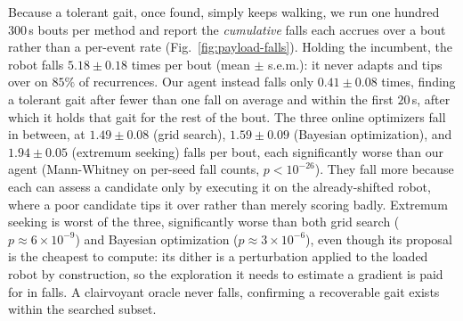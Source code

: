 \documentclass[letterpaper, 10 pt, conference]{ieeeconf}  %
\begin{document}
Because a tolerant gait, once found, simply keeps walking, we run one hundred $300$\,s bouts per method and report the \emph{cumulative} falls each accrues over a bout rather than a per-event rate (Fig.~\ref{fig:payload-falls}).
Holding the incumbent, the robot falls $5.18 \pm 0.18$ times per bout (mean $\pm$ s.e.m.): it never adapts and tips over on $85\%$ of recurrences.
Our agent instead falls only $0.41 \pm 0.08$ times, finding a tolerant gait after fewer than one fall on average and within the first $20$\,s, after which it holds that gait for the rest of the bout.
The three online optimizers fall in between, at $1.49 \pm 0.08$ (grid search), $1.59 \pm 0.09$ (Bayesian optimization), and $1.94 \pm 0.05$ (extremum seeking) falls per bout, each significantly worse than our agent (Mann-Whitney on per-seed fall counts, $p < 10^{-26}$).
They fall more because each can assess a candidate only by executing it on the already-shifted robot, where a poor candidate tips it over rather than merely scoring badly.
Extremum seeking is worst of the three, significantly worse than both grid search ($p \approx 6 \times 10^{-9}$) and Bayesian optimization ($p \approx 3 \times 10^{-6}$), even though its proposal is the cheapest to compute: its dither is a perturbation applied to the loaded robot by construction, so the exploration it needs to estimate a gradient is paid for in falls.
A clairvoyant oracle never falls, confirming a recoverable gait exists within the searched subset.
\end{document}
